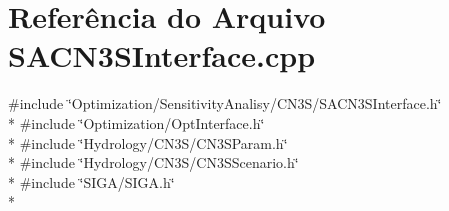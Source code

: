 \section{Referência do Arquivo S\+A\+C\+N3\+S\+Interface.\+cpp}
\label{_s_a_c_n3_s_interface_8cpp}
{\ttfamily \#include \char`\"{}Optimization/\+Sensitivity\+Analisy/\+C\+N3\+S/\+S\+A\+C\+N3\+S\+Interface.\+h\char`\"{}}\\*
{\ttfamily \#include \char`\"{}Optimization/\+Opt\+Interface.\+h\char`\"{}}\\*
{\ttfamily \#include \char`\"{}Hydrology/\+C\+N3\+S/\+C\+N3\+S\+Param.\+h\char`\"{}}\\*
{\ttfamily \#include \char`\"{}Hydrology/\+C\+N3\+S/\+C\+N3\+S\+Scenario.\+h\char`\"{}}\\*
{\ttfamily \#include \char`\"{}S\+I\+G\+A/\+S\+I\+G\+A.\+h\char`\"{}}\\*
